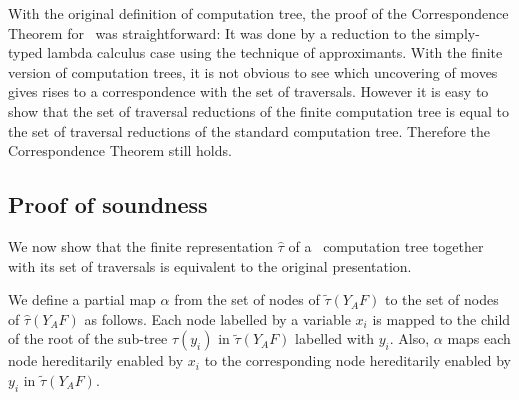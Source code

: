 \documentclass{article}
\begin{document}
With the original definition of computation tree, the proof of
the Correspondence Theorem for \pcf\ was straightforward: It was done by a reduction
to the simply-typed lambda calculus case using the technique of approximants.
With the finite version of computation trees, it is not obvious to see which uncovering of moves gives rises to a correspondence with the set of traversals. However it is easy to show that the set of traversal reductions of the finite computation tree is equal to the set of traversal reductions of the standard computation tree. Therefore the Correspondence Theorem still holds.


\subsection*{Proof of soundness}

We now show that the finite representation $\hat\tau$ of a \pcf\ computation tree together with its set of traversals is equivalent to the original presentation.


We define a partial map $\alpha$ from the set of nodes of $\widetilde\tau(Y_A F)$ to the set of nodes of $\hat\tau(Y_A F)$ as follows. Each node labelled by a variable $x_i$ is mapped to the child of the root of the sub-tree $\tau(y_i)$ in $\widetilde\tau(Y_A F)$ labelled with $y_i$. Also, $\alpha$ maps each node hereditarily enabled by $x_i$ to the corresponding node hereditarily enabled by $y_i$ in $\widetilde\tau(Y_A F)$.
\end{document}
